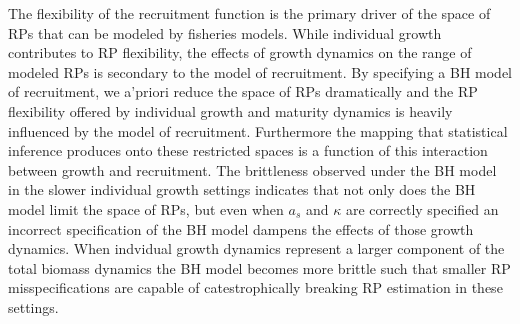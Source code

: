 %
The flexibility of the recruitment function is the primary driver of the space 
of RPs that can be modeled by fisheries models. While individual growth 
contributes to RP flexibility, the effects of growth dynamics on the range of 
modeled RPs is secondary to the model of recruitment. By specifying a BH model 
of recruitment, we a'priori reduce the space of RPs dramatically and the RP 
flexibility offered by individual growth and maturity dynamics is heavily influenced
by the model of recruitment. Furthermore the mapping that statistical inference 
produces onto these restricted spaces is a function of this interaction between 
growth and recruitment. The brittleness observed under the BH model in the 
slower individual growth settings indicates that not only does the BH model limit 
the space of RPs, but even when $a_s$ and $\kappa$ are correctly specified an 
incorrect specification of the BH model dampens the effects of those growth dynamics. %
When indvidual growth dynamics represent a larger component of the total biomass 
dynamics the BH model becomes more brittle such that smaller RP misspecifications are capable of 
catestrophically breaking RP estimation in these settings.



